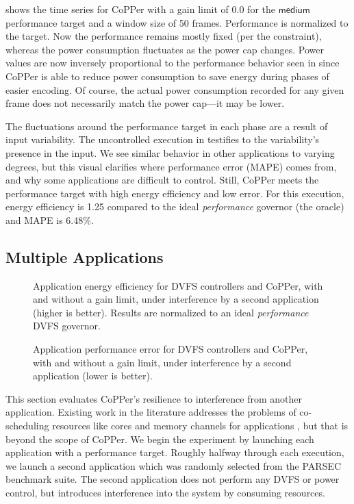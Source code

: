  shows the time series for CoPPer with a gain limit of 0.0 for the $\mathsf{medium}$ performance target and a window size of 50 frames.
Performance is normalized to the target.
Now the performance remains mostly fixed (per the constraint), whereas the power consumption fluctuates as the power cap changes.
Power values are now inversely proportional to the performance behavior seen in  since CoPPer is able to reduce power consumption to save energy during phases of easier encoding.
Of course, the actual power consumption recorded for any given frame does not necessarily match the power cap---it may be lower.

The fluctuations around the performance target in each phase are a result of input variability.
The uncontrolled execution in  testifies to the variability's presence in the input.
We see similar behavior in other applications to varying degrees, but this visual clarifies where performance error (MAPE) comes from, and why some applications are difficult to control.
Still, CoPPer meets the performance target with high energy efficiency and low error.
For this execution, energy efficiency is 1.25 compared to the ideal \emph{performance} governor (the oracle) and MAPE is 6.48\%.


\subsection{Multiple Applications}
\label{sec:copper-eval-multiapp}

\begin{figure*}[t]
  \centering
  
  \caption{Application energy efficiency for DVFS controllers and CoPPer, with and without a gain limit, under interference by a second application (higher is better). Results are normalized to an ideal \emph{performance} DVFS governor.}
  \label{fig:copper-multi-ee}
\end{figure*}

\begin{figure*}[t]
  \centering
  
  \caption{Application performance error for DVFS controllers and CoPPer, with and without a gain limit, under interference by a second application (lower is better).}
  \label{fig:copper-multi-mape}
\end{figure*}

This section evaluates CoPPer's resilience to interference from
another application.
Existing work in the literature addresses the problems of co-scheduling resources like cores and memory channels for applications \cite{Callisto,Pandia}, but that is beyond the scope of CoPPer.
We begin the experiment by launching each application with a performance target.
Roughly halfway through each execution, we launch a second application which was randomly selected from the PARSEC benchmark suite.
The second application does not perform any DVFS or power control, but introduces interference into the system by consuming resources.


